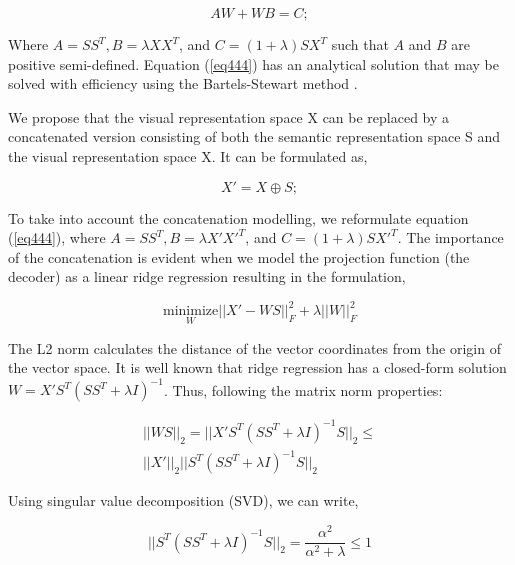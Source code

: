 \documentclass{article}
\begin{document}
\begin{equation}
\label{eq444}
AW+WB = C;
\end{equation}

Where $A = SS^T, B = \lambda XX^T$, and $C = (1 + \lambda) SX^T$ such that $A$ and $B$ are positive semi-defined. Equation (\ref{eq444}) has an analytical solution that may be solved with efficiency using the Bartels-Stewart method \cite{b50}.
\par We propose that the visual representation space X can be replaced by a concatenated version consisting of both the semantic representation space S and the visual representation space X. It can be formulated as, 

\begin{equation}
\label{eq555}
X'= X \oplus S;
\end{equation}

To take into account the concatenation modelling, we reformulate equation (\ref{eq444}), where $A = SS^T, B = \lambda X'X'^T$, and $C = (1 + \lambda) SX'^T$. 
The importance of the concatenation is evident when we model the projection function (the decoder) as a linear ridge regression resulting in the formulation, 

\begin{equation}
\label{eq666}
\underset{W}{\text{minimize}}  ||X'-WS||^{2}_{F} + \lambda||W||^{2}_{F}
\end{equation}

The L2 norm calculates the distance of the vector coordinates from the origin of the vector space. It is well known that ridge regression has a closed-form solution $W = X'S^T(SS^T+\lambda I)^{-1}$. Thus, following the matrix norm properties: 

\begin{equation}
\label{eq777}
\begin{split}
||WS||_2 = ||X'S^T(SS^T+\lambda I)^{-1}S||_2 \leq\\ ||X'||_2||S^T(SS^T+\lambda I)^{-1}S||_2
\end{split}
\end{equation}

Using singular value decomposition (SVD), we can write,

\begin{equation}
\label{eq888}
||S^T(SS^T+\lambda I)^{-1}S||_2 = \frac{\alpha^2}{\alpha^2 + \lambda} \leq 1
\end{equation}
\end{document}
